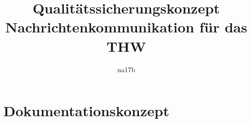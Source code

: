 \documentclass[a4paper,11pt,oneside, titlepage]{article}
\title{Qualitätssicherungskonzept\\Nachrichtenkommunikation für das THW}
\author{na17b}
\date{}
\begin{document}
\maketitle


\tableofcontents


\newpage


\section{Dokumentationskonzept}







\end{document}

